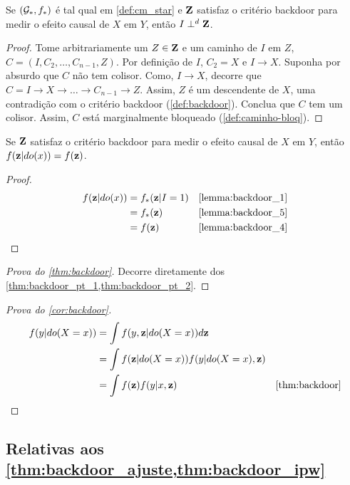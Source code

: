 \begin{lemma}
 \label{lemma:backdoor_5}
 Se $({\mathcal G}_*, f_*)$ é tal qual em \cref{def:cm_star} e
 ${\mathbf{Z}}$ satisfaz o critério backdoor para
 medir o efeito causal de $X$ em $Y$, então $I \perp^d {\mathbf{Z}}$.
\end{lemma}

\begin{proof}
 Tome arbitrariamente um $Z \in {\mathbf{Z}}$ e
 um caminho de $I$ em $Z$, 
 $C = (I, C_2, \ldots, C_{n-1}, Z)$.
 Por definição de $I$, $C_2 = X$ e
 $I \rightarrow X$. 
 Suponha por absurdo que $C$ não tem colisor.
 Como, $I \rightarrow X$, decorre que
 $C = I \rightarrow X \rightarrow \ldots 
 \rightarrow C_{n-1} \rightarrow Z$.
 Assim, $Z$ é um descendente de $X$,
 uma contradição com 
 o critério backdoor (\cref{def:backdoor}).
 Conclua que $C$ tem um colisor.
 Assim, $C$ está marginalmente bloqueado
 (\cref{def:caminho-bloq}).
\end{proof}

\begin{lemma}
 \label{thm:backdoor_pt_2}
 Se ${\mathbf{Z}}$ satisfaz o critério backdoor para
 medir o efeito causal de $X$ em $Y$, então
 $f({\mathbf{z}}|do(x)) = f({\mathbf{z}})$.
\end{lemma}

\begin{proof}
 \begin{align*}
  f(\z|do(x))
  &= f_*(\z|I=1)
  & \text{\cref{lemma:backdoor_1}} \\
  &= f_*(\z)
  & \text{\cref{lemma:backdoor_5}} \\
  &= f(\z)
  & \text{\cref{lemma:backdoor_4}}
 \end{align*}
\end{proof}

\begin{proof}[Prova do \cref{thm:backdoor}]
 Decorre diretamente dos
 \cref{thm:backdoor_pt_1,thm:backdoor_pt_2}.
\end{proof}

\begin{proof}[Prova do \cref{cor:backdoor}]
 \begin{align*}
  f(y|do(X=x))
  &= \int f(y,\z|do(X=x))d\z \\
  &= \int f(\z|do(X=x))f(y|do(X=x),\z) \\
  &= \int f(\z)f(y|x,\z)
  & \text{\cref{thm:backdoor}}
 \end{align*}
\end{proof}

\subsection{Relativas aos \cref{thm:backdoor_ajuste,thm:backdoor_ipw}}

